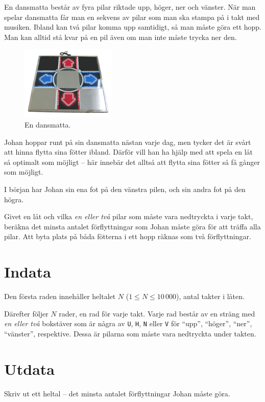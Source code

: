 En dansmatta består av fyra pilar riktade upp, höger, ner och vänster.
När man spelar dansmatta får man en sekvens av pilar som man ska stampa på i takt med musiken.
Ibland kan två pilar komma upp samtidigt, så man måste göra ett hopp.
Man kan alltid stå kvar på en pil även om man inte måste trycka ner den.

\begin{figure}[ht!]
    \centering
    \includegraphics[width=0.4\textwidth]{dansmatta.png}
\caption{En dansmatta.}
\label{fig:sample1}
\end{figure}

Johan hoppar runt på sin dansmatta nästan varje dag, men tycker det är svårt att hinna flytta sina fötter ibland.
Därför vill han ha hjälp med att spela en låt så optimalt som möjligt -- här innebär det alltså att flytta sina fötter så få gånger som möjligt.

I början har Johan sin ena fot på den vänstra pilen, och sin andra fot på den högra.

Givet en låt och vilka \emph{en eller två} pilar som måste vara nedtryckta i varje takt, beräkna det minsta antalet förflyttningar som Johan måste göra för att träffa alla pilar.
Att byta plats på båda fötterna i ett hopp räknas som två förflyttningar.


\section*{Indata}
Den första raden innehåller heltalet $N$ ($1 \le N \le 10\,000$), antal takter i låten.

Därefter följer $N$ rader, en rad för varje takt. Varje rad består av en sträng med \emph{en eller två} bokstäver som är några av \texttt{U}, \texttt{H}, \texttt{N} eller \texttt{V} för ``upp'', ``höger'', ``ner'', ``vänster'', respektive.
Dessa är pilarna som måste vara nedtryckta under takten.

\section*{Utdata}
Skriv ut ett heltal -- det minsta antalet förflyttningar Johan måste göra.

